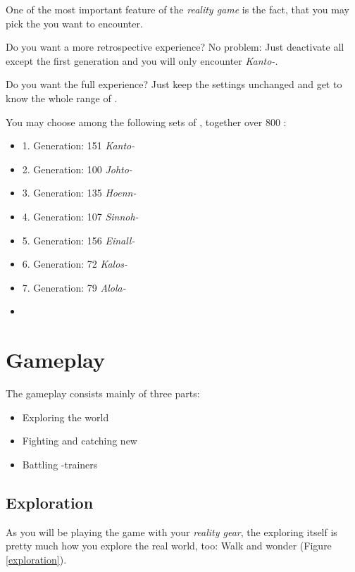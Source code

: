 One of the most important feature of the \emph{\poke{} reality game} is the fact, that you may pick the \poke{} you want to encounter. 

Do you want a more retrospective experience? No problem: Just deactivate all \poke{} except the first generation and you will only encounter \emph{Kanto-\poke{}}.

Do you want the full experience? Just keep the settings unchanged and get to know the whole range of \poke{}.

You may choose among the following sets of \poke{}, together over 800 \poke{}:
\begin{multicols}{2}
\begin{itemize}
\setlength\itemsep{.05em}
\item 1. Generation: 151 \emph{Kanto-\pokeT}
\item 2. Generation: 100 \emph{Johto-\pokeT}
\item 3. Generation: 135 \emph{Hoenn-\pokeT}
\item 4. Generation: 107 \emph{Sinnoh-\pokeT}
\item 5. Generation: 156 \emph{Einall-\pokeT}
\item 6. Generation: 72 \emph{Kalos-\pokeT}
\item 7. Generation: 79 \emph{Alola-\pokeT}
\item[]
\end{itemize}
\end{multicols}

\section{Gameplay}

The gameplay consists mainly of three parts:
\begin{itemize}
\item Exploring the world
\item Fighting and catching new \poke{}
\item Battling \poke{}-trainers
\end{itemize}

\subsection{Exploration}

As you will be playing the game with your \emph{\poke{} reality gear}, the exploring itself is pretty much how you explore the real world, too: Walk and wonder (Figure \ref{exploration}).

